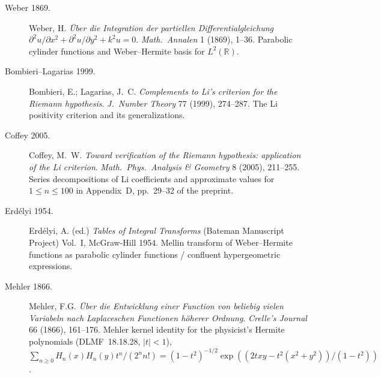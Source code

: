 \begin{description}
\item[Weber 1869.] Weber, H. \emph{\"Uber die Integration der
partiellen Differentialgleichung
\(\partial^{2}u/\partial x^{2}+\partial^{2}u/\partial y^{2}+k^{2}u=0\)}.
\emph{Math.~Annalen} 1 (1869), 1--36. Parabolic cylinder functions
and Weber--Hermite basis for \(L^{2}(\mathbb{R})\).
\item[Bombieri--Lagarias 1999.] Bombieri, E.; Lagarias, J.~C.
\emph{Complements to Li's criterion for the Riemann hypothesis}.
\emph{J.~Number Theory} 77 (1999), 274--287.
The Li positivity criterion and its generalizations.
\item[Coffey 2005.] Coffey, M.~W. \emph{Toward verification of the
Riemann hypothesis: application of the Li criterion}.
\emph{Math.~Phys.~Analysis \& Geometry} 8 (2005), 211--255.
Series decompositions of Li coefficients and approximate values
for $1\le n\le100$ in Appendix~D, pp.~29--32 of the preprint.
\item[Erd\'elyi 1954.] Erd\'elyi, A. (ed.) \emph{Tables of Integral
Transforms} (Bateman Manuscript Project) Vol.~I, McGraw-Hill 1954.
Mellin transform of Weber--Hermite functions as parabolic cylinder
functions / confluent hypergeometric expressions.
\item[Mehler 1866.] Mehler, F.G. \emph{\"Uber die Entwicklung einer
Function von beliebig vielen Variabeln nach Laplaceschen Functionen
h\"oherer Ordnung}. \emph{Crelle's Journal} 66 (1866), 161--176.
Mehler kernel identity for the physicist's Hermite polynomials
(DLMF~18.18.28, $|t|<1$),
\(\sum_{n\geq 0}H_{n}(x)H_{n}(y)t^{n}/(2^n n!)=(1-t^{2})^{-1/2}\exp((2txy-t^{2}(x^{2}+y^{2}))/(1-t^{2}))\).
\end{description}

